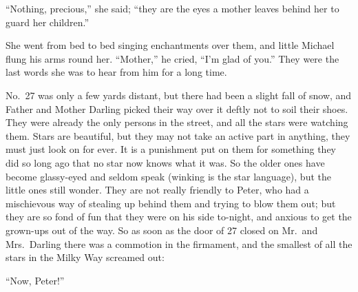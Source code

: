 ``Nothing, precious,'' she said; ``they are the eyes a mother leaves behind her
to guard her children.''

She went from bed to bed singing enchantments over them, and little Michael
flung his arms round her. ``Mother,'' he cried, ``I'm glad of you.'' They were
the last words she was to hear from him for a long time.

No.\ 27 was only a few yards distant, but there had been a slight fall of snow,
and Father and Mother Darling picked their way over it deftly not to soil their
shoes. They were already the only persons in the street, and all the stars were
watching them. Stars are beautiful, but they may not take an active part in
anything, they must just look on for ever. It is a punishment put on them for
something they did so long ago that no star now knows what it was. So the older
ones have become glassy-eyed and seldom speak (winking is the star language),
but the little ones still wonder. They are not really friendly to Peter, who had
a mischievous way of stealing up behind them and trying to blow them out; but
they are so fond of fun that they were on his side to-night, and anxious to get
the grown-ups out of the way. So as soon as the door of 27 closed on Mr.\ and
Mrs.\ Darling there was a commotion in the firmament, and the smallest of all
the stars in the Milky Way screamed out:

``Now, Peter!''
